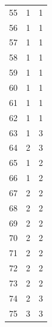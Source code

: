 \begin{small}
\begin{longtable}{rrr}
55 & 1 & 1 \\
56 & 1 & 1 \\
57 & 1 & 1 \\
58 & 1 & 1 \\
59 & 1 & 1 \\
60 & 1 & 1 \\
61 & 1 & 1 \\
62 & 1 & 1 \\
63 & 1 & 3 \\
64 & 2 & 3 \\
65 & 1 & 2 \\
66 & 1 & 2 \\
67 & 2 & 2 \\
68 & 2 & 2 \\
69 & 2 & 2 \\
70 & 2 & 2 \\
71 & 2 & 2 \\
72 & 2 & 2 \\
73 & 2 & 2 \\
74 & 2 & 3 \\
75 & 3 & 3 \\
\end{longtable}
\end{small}
